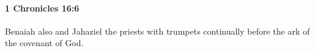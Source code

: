 
		\paragraph{1 Chronicles 16:6} %
			\label{1CHRONICLES-16-6}

			Benaiah also and Jahaziel the priests with trumpets continually before the ark of the covenant of God.


